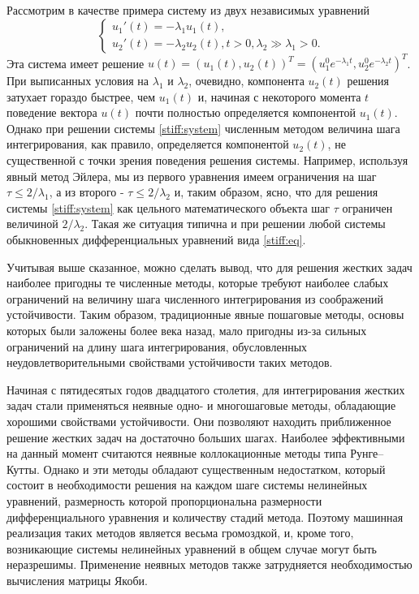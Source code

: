 \documentclass[a4paper,14pt]{extreport}
\begin{document}
  
  Рассмотрим в качестве примера систему из двух независимых уравнений   
  \begin{equation}
  \label{stiff:system}
  \begin{cases}
   u_1'(t)=-\lambda_1 u_1(t), 
   \\
    u_2'(t)=-\lambda_2 u_2(t), t>0, \lambda_2 \gg \lambda_1 > 0.
  \end{cases}
  \end{equation}
  Эта система имеет решение $u(t)=(u_1(t), u_2(t))^T = (u_1^0 e^{-\lambda_1 t}, u_2^0 e^{-\lambda_2 t})^T$. При выписанных условия на $\lambda_1$ и $\lambda_2$, очевидно, компонента $u_2(t)$ решения затухает гораздо быстрее, чем $u_1(t)$ и, начиная с некоторого момента $t$ поведение вектора $u(t)$ почти полностью определяется компонентой $u_1(t)$. Однако при решении системы \eqref{stiff:system} численным методом величина шага интегрирования, как правило, определяется компонентой $u_2(t)$, не существенной с точки зрения поведения решения системы. Например, используя явный метод Эйлера, мы из первого уравнения имеем ограничения на шаг $\tau \le 2/\lambda_1$, а из второго - $\tau \le 2/\lambda_2$ и, таким образом, ясно, что для решения системы \eqref{stiff:system} как цельного математического объекта шаг $\tau$ ограничен величиной $2/\lambda_2$. Такая же ситуация типична и при решении любой системы обыкновенных дифференциальных уравнений вида \eqref{stiff:eq}.
  
Учитывая выше сказанное, можно сделать вывод, что для решения жестких задач наиболее пригодны те численные методы, которые требуют наиболее слабых ограничений на величину шага численного интегрирования из соображений устойчивости. Таким образом, традиционные явные пошаговые методы, основы которых были заложены более века назад, мало пригодны из-за сильных ограничений на длину шага интегрирования, обусловленных неудовлетворительными свойствами устойчивости таких методов. 

 
 Начиная с пятидесятых годов двадцатого столетия, для интегрирования жестких задач стали применяться неявные одно- и многошаговые методы, обладающие хорошими свойствами устойчивости. Они позволяют находить приближенное решение жестких задач на достаточно больших шагах. Наиболее эффективными на данный момент считаются неявные коллокационные методы типа Рунге–Кутты. Однако и эти методы обладают существенным недостатком, который состоит в необходимости решения на каждом шаге системы нелинейных уравнений, размерность которой пропорциональна размерности дифференциального уравнения и количеству стадий метода. Поэтому машинная реализация таких методов является весьма громоздкой, и, кроме того, возникающие системы нелинейных уравнений в общем случае могут быть неразрешимы. Применение неявных методов также затрудняется необходимостью вычисления матрицы Якоби.
 
\end{document}
